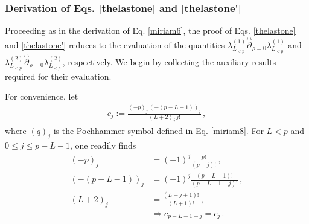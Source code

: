 \documentclass[aps,twocolumn,nofootinbib]{revtex4}
\begin{document}
{\begin{appendix}
\subsubsection{Derivation of Eqs. \eqref{thelastone} and \eqref{thelastone'}}\label{ap-59-norm}

Proceeding as in the derivation of Eq. \eqref{miriam6}, the proof of Eqs. \eqref{thelastone} and \eqref{thelastone'} reduces to the evaluation of the quantities $\overline{\lambda^{(1)}_{L^{}_{<p}}}\stackrel{\leftrightarrow}{\partial}_{\rho=0}\lambda^{(1)}_{L^{}_{<p}}$ and $\overline{\lambda^{(2)}_{L^{}_{<p}}}\stackrel{\leftrightarrow}{\partial}_{\rho=0}\lambda^{(2)}_{L^{}_{<p}}$, respectively. We begin by collecting the auxiliary results required for their evaluation.

For convenience, let
\begin{align}
    c_j := \frac{(-p)_j\,\left(-(p-L-1)\right)_j}{(L+2)_j \,j!}\,,
\end{align}
where $(q)_j$ is the Pochhammer symbol defined in Eq. \eqref{miriam8}. For $L<p$ and $0\leqslant j\leqslant p-L-1$, one readily finds
\begin{align}
    (-p)_j &= (-1)^j\frac{p!}{(p-j)!} \,, \nonumber\\[3pt]
    \left(-(p-L-1)\right)_j &= (-1)^j\frac{(p-L-1)!}{(p-L-1-j)!} \,, \nonumber\\[3pt]
    (L+2)_j &= \frac{(L+j+1)!}{(L+1)!} \,,\nonumber\\[3pt]
    &\Longrightarrow c_{p-L-1-j} = c_j \,.
\end{align}


\end{appendix}}
\end{document}
